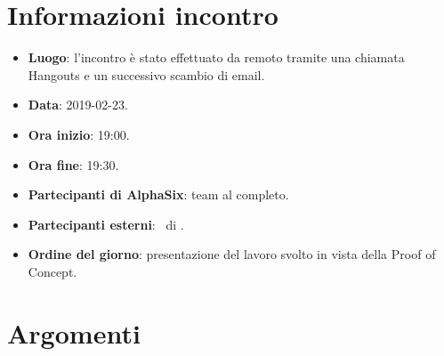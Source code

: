 \newcommand{\documento}{\VE}
\newcommand{\nomedocumentofisico}{VE\_2019-02-23.pdf}
\newcommand{\redazione}{\TG}
\newcommand{\verifica}{\SG}
\newcommand{\approvazione}{\CV}
\newcommand{\versione}{1.0.0}
\newcommand{\uso}{Esterno}
\newcommand{\destinateTo}{\TV, \\ & \RC, \\ & \II}
\newcommand{\datacreazione}{23 febbraio 2019}
\newcommand{\datamodifica}{25 febbraio 2019}
\newcommand{\stato}{Approvato}

\def\TABELLE{false}	%
\def\FIGURE{false} 	%






    

    
    
    \section{Informazioni incontro}
    	\begin{itemize}
    		\item \textbf{Luogo}: l'incontro è stato effettuato da remoto tramite una chiamata Hangouts e un successivo scambio di email.
    		\item \textbf{Data}: 2019-02-23.
    		\item \textbf{Ora inizio}: 19:00.
    		\item \textbf{Ora fine}: 19:30.
    		\item \textbf{Partecipanti di AlphaSix}: team al completo.
    		\item \textbf{Partecipanti esterni}: \DZ~di \II.
    		\item \textbf{Ordine del giorno}: presentazione del lavoro svolto in vista della Proof of Concept.
    		
    	\end{itemize}
    
    \section{Argomenti}
    
